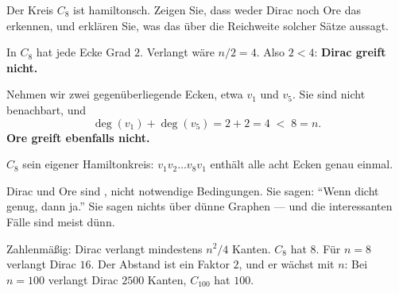 \begin{aufgabe}
Der Kreis $C_8$ ist hamiltonsch. Zeigen Sie, dass weder Dirac noch Ore das erkennen, und erklären Sie, was das über die Reichweite solcher Sätze aussagt.

\loesung
{}
In $C_8$ hat jede Ecke Grad $2$. Verlangt wäre $n/2 = 4$. Also $2 < 4$: \textbf{Dirac greift nicht.}

Nehmen wir zwei gegenüberliegende Ecken, etwa $v_1$ und $v_5$. Sie sind nicht benachbart, und
\[ \deg(v_1) + \deg(v_5) = 2 + 2 = 4 \;<\; 8 = n . \]
\textbf{Ore greift ebenfalls nicht.}

$C_8$  sein eigener Hamiltonkreis: $v_1 v_2 \ldots v_8 v_1$ enthält alle acht Ecken genau einmal.

\begin{center}
\begin{minipage}{0.9\textwidth}
Dirac und Ore sind , nicht notwendige Bedingungen. Sie sagen: \enquote{Wenn dicht genug, dann ja.} Sie sagen nichts über dünne Graphen --- und die interessanten Fälle sind meist dünn.

Zahlenmäßig: Dirac verlangt mindestens $n^2/4$ Kanten. $C_8$ hat $8$. Für $n = 8$ verlangt Dirac $16$. Der Abstand ist ein Faktor $2$, und er wächst mit $n$: Bei $n = 100$ verlangt Dirac $2500$ Kanten, $C_{100}$ hat $100$.
\end{minipage}
\end{center}

\begin{center}
\begin{minipage}{0.86\textwidth}
\end{minipage}
\end{center}
\end{aufgabe}


